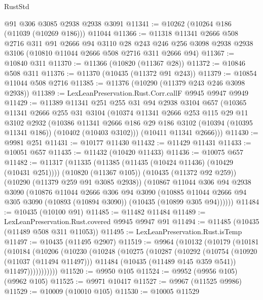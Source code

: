 \begin{lexlean}{RustStd}
\begin{coremodule}
{\begin{coremodule}
{{{{{{{{{{{{{{{{{{{{{{{{{{{{{{{{{{{{{{{{{{{{{{{{{{{{{{{{{{{{{{{{{{{{{{{{{{{{{{    @91
    @306
    @3085
    @2938
    @2938
    @3091
@11341 := @10262 (@10264 @186 (@11039 (@10269 @186))) @11044
@11366 := @11318
    @11341
    @2666
    @508
    @2716
    @311
    @91
    @2666
    @94
    @3110
    @28
    @243
    @246
    @256
    @3098
    @2938
    @2938
    @3106
    (@10810 @11044 @2666 @508 @2716 @311 @2666 @94)
@11367 := @10840 @311
@11370 := @11366 (@10820 (@11367 @28))
@11372 := @10846 @508 @311
@11376 := @11370 (@10435 (@11372 @91 @243))
@11379 := @10854 @11044 @508 @2716
@11385 := @11376 (@10290 (@11379 @243 @246 @3098 @2938))
@11389 := LexLeanPreservation.Rust.Corr.callF @9945 @9947 @9949
@11429 := @11389
    @11341
    @251
    @255
    @31
    @94
    @2938
    @3104
    @657
    (@10365
      @11341
      @2666
      @255
      @31
      @3104
      (@10374
        @11341
        @2666
        @253
        @115
        @29
        @11
        @3102
        @2932
        (@10386
          @11341
          @2666
          @186
          @29
          @186
          @3102
          (@10394 (@10395 @11341 @186))
          (@10402 (@10403 @3102)))
        (@10411 @11341 @2666)))
@11430 := @9981 @251
@11431 := @10177 @11430
@11432 := @11429 @11431
@11433 := @10051 @657
@11435 := @11432 (@10420 @11433)
@11436 := @10075 @657
@11482 := @11317
    (@11335
      (@11385 (@11435 (@10424 @11436) (@10429 (@10431 @251))))
      (@10820 (@11367 @105))
      (@10435 (@11372 @92 @259))
      (@10290 (@11379 @259 @91 @3085 @2938))
      (@10867
        @11044
        @306
        @94
        @2938
        @3090
        (@10876
          @11044
          @2666
          @306
          @94
          @3090
          (@10885 @11044 @2666 @94 @305 @3090 (@10893 (@10894 @3090)) (@10435 (@10899 @305 @94))))))
@11484 := @10435 (@10100 @91)
@11485 := @11482 @11484
@11489 := LexLeanPreservation.Rust.covered @9945 @9947 @91
@11494 := @11485 (@10435 (@11489 @508 @311 @11053))
@11495 := LexLeanPreservation.Rust.isTemp
@11497 := @10435 (@11495 @2907)
@11519 := @9964
    (@10132
      (@10179
        (@10181
          (@10184
            (@10206
              (@10230
                (@10248
                  (@10275
                    (@10287
                      (@10292
                        (@10754
                          (@10920 (@11037 (@11494 @11497)))
                          @11484
                          (@10435 (@11489 @145 @359 @541))
                          @11497)))))))))))
@11520 := @9950 @105
@11524 := @9952 (@9956 @105) (@9962 @105)
@11525 := @9971 @10417
@11527 := @9967 (@11525 @9986)
@11529 := @10009 (@10010 @105)
@11530 := @10005 @11529
}}}}}}}}}}}}}}}}}}}}}}}}}}}}}}}}}}}}}}}}}}}}}}}}}}}}}}}}}}}}}}}}}}}}}}}}}}}}}}
\end{coremodule}}
\end{coremodule}
\end{lexlean}
